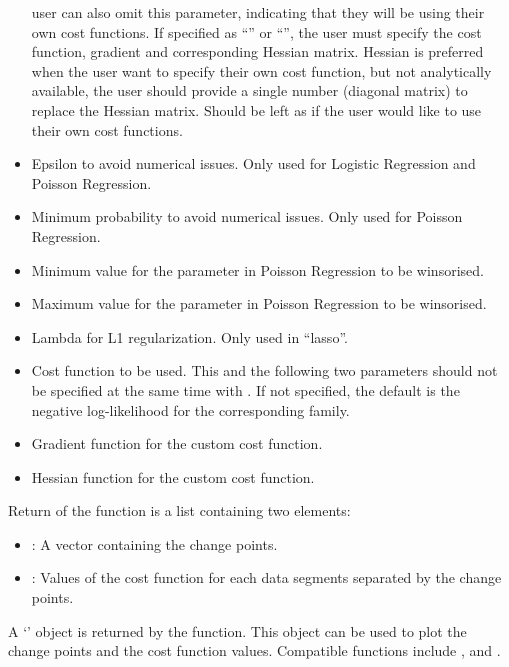 \documentclass[article]{jss}
\newcommand{\class}[1]{`\code{#1}'}
\newcommand{\fct}[1]{\code{#1()}}
\begin{document}
\begin{itemize}
    user can also omit this parameter, indicating that they will be using their
    own cost functions. If specified as ``'' or ``'', the user must
    specify the cost function, gradient and corresponding Hessian matrix.
    Hessian is preferred when the user want to specify their own cost function,
    but not analytically available, the user should provide a single number
    (diagonal matrix) to replace the Hessian matrix. Should be left as
     if the user would like to use their own cost functions.
  \item {} Epsilon to avoid numerical issues. Only used for Logistic
    Regression and Poisson Regression.
  \item {} Minimum probability to avoid numerical issues. Only used
    for Poisson Regression.
  \item {} Minimum value for the parameter in Poisson
    Regression to be winsorised.
  \item {} Maximum value for the parameter in Poisson
    Regression to be winsorised.
  \item {} Lambda for L1 regularization. Only used in ``lasso''.
  \item {} Cost function to be used. This and the following two
    parameters should not be specified at the same time with .
    If not specified, the default is the negative log-likelihood for the
    corresponding family.
  \item {} Gradient function for the custom cost function.
  \item {} Hessian function for the custom cost function.
\end{itemize}
Return of the function is a list containing two elements:
\begin{itemize}
  \item {}: A vector containing the change points.
  \item {}: Values of the cost function for each data segments
    separated by the change points.
\end{itemize}

A \class{fastcpd} object is returned by the function. This object can be used
to plot the change points and the cost function values. Compatible functions
include \fct{plot}, \fct{print} and \fct{summary}.
\end{document}
